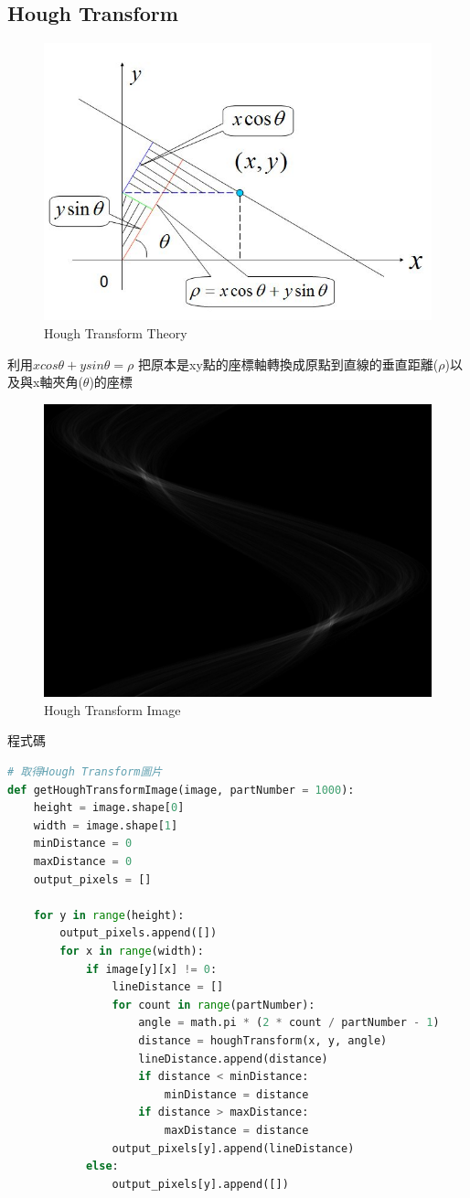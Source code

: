 \documentclass[12pt,a4paper]{article}
\begin{document}
\subsection{Hough Transform}
{

\begin{figure}[ht]
\centering
\includegraphics[width=.6\textwidth]{image/houghtransform.jpg}
\caption{Hough Transform Theory}%
\label{要合併的兩張圖}%
\end{figure}
利用$xcos \theta + ysin \theta = \rho$
\newline
把原本是xy點的座標軸轉換成原點到直線的垂直距離($\rho$)以及與x軸夾角($\theta$)的座標

\begin{figure}[ht]
\centering
\includegraphics[width=.6\textwidth]{image/hough_transform_image.png}
\caption{Hough Transform Image}%
\label{要合併的兩張圖}%
\end{figure}


程式碼
\begin{lstlisting}[language=Python]
# 取得Hough Transform圖片
def getHoughTransformImage(image, partNumber = 1000):
    height = image.shape[0]
    width = image.shape[1]
    minDistance = 0
    maxDistance = 0
    output_pixels = []

    for y in range(height):
        output_pixels.append([])
        for x in range(width):
            if image[y][x] != 0:
                lineDistance = []
                for count in range(partNumber):
                    angle = math.pi * (2 * count / partNumber - 1)
                    distance = houghTransform(x, y, angle)
                    lineDistance.append(distance)
                    if distance < minDistance:
                        minDistance = distance
                    if distance > maxDistance:
                        maxDistance = distance
                output_pixels[y].append(lineDistance)
            else:
                output_pixels[y].append([])


\end{lstlisting}}
\end{document}

